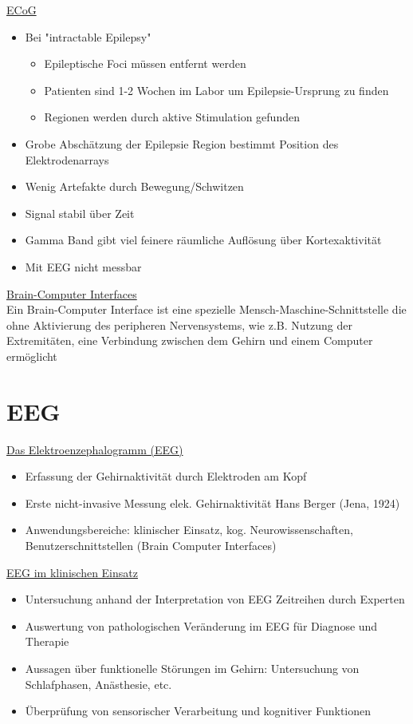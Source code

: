\documentclass[a4paper,10pt,oneside]{article}
\begin{document}
\underline{ECoG} \\
	\begin{itemize}
		\item Bei "intractable Epilepsy"
			\begin{itemize}
				\item Epileptische Foci müssen entfernt werden
				\item Patienten sind 1-2 Wochen im Labor um Epilepsie-Ursprung zu finden
				\item Regionen werden durch aktive Stimulation gefunden
			\end{itemize}
		\item Grobe Abschätzung der Epilepsie Region bestimmt Position des Elektrodenarrays
		\item Wenig Artefakte durch Bewegung/Schwitzen
		\item Signal stabil über Zeit
		\item Gamma Band gibt viel feinere räumliche Auflösung über Kortexaktivität
		\item Mit EEG nicht messbar
	\end{itemize}
	
\underline{Brain-Computer Interfaces} \\
Ein Brain-Computer Interface ist eine spezielle Mensch-Maschine-Schnittstelle die ohne Aktivierung des peripheren Nervensystems, wie z.B. Nutzung der Extremitäten, eine Verbindung zwischen dem Gehirn und einem Computer ermöglicht 
 		
 		
\section{EEG}
\underline{Das Elektroenzephalogramm (EEG)} \\
	\begin{itemize}
		\item Erfassung der Gehirnaktivität durch Elektroden am Kopf 
		\item Erste nicht-invasive Messung elek. Gehirnaktivität Hans Berger (Jena, 1924)
		\item Anwendungsbereiche: klinischer Einsatz, kog. Neurowissenschaften, Benutzerschnittstellen (Brain Computer Interfaces)
	\end{itemize}
	
\underline{EEG im klinischen Einsatz} \\
	\begin{itemize}
		\item Untersuchung anhand der Interpretation von EEG Zeitreihen durch Experten
		\item Auswertung von pathologischen Veränderung im EEG für Diagnose und Therapie
		\item Aussagen über funktionelle Störungen im Gehirn: Untersuchung von Schlafphasen, Anästhesie, etc. 
		\item Überprüfung von sensorischer Verarbeitung und kognitiver Funktionen
	\end{itemize}
\end{document}
